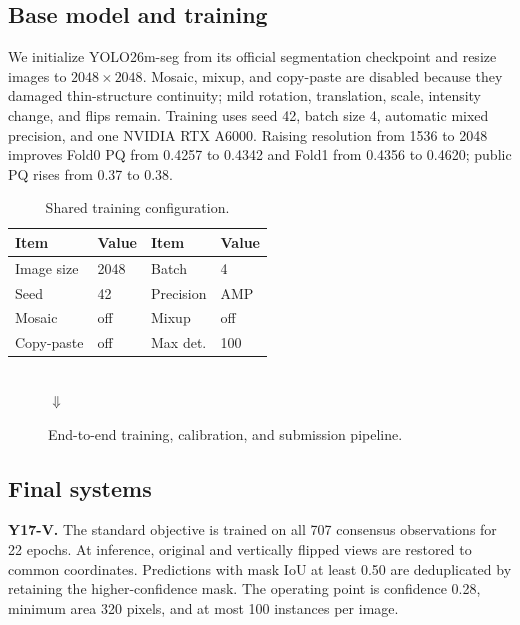 \documentclass[sigconf]{acmart}
\begin{document}
\subsection{Base model and training}
We initialize YOLO26m-seg \cite{ultralytics} from its official segmentation checkpoint and resize
images to $2048\!\times\!2048$. Mosaic, mixup, and copy-paste are disabled because they damaged
thin-structure continuity; mild rotation, translation, scale, intensity change, and flips remain.
Training uses seed 42, batch size 4, automatic mixed precision, and one NVIDIA RTX A6000. Raising
resolution from 1536 to 2048 improves Fold0 PQ from 0.4257 to 0.4342 and Fold1 from 0.4356 to
0.4620; public PQ rises from 0.37 to 0.38.

\begin{table}[!h]
\centering
\caption{Shared training configuration.}
\label{tab:training}
\small
\begin{tabular}{ll@{\qquad}ll}
\toprule
Item & Value & Item & Value \\
\midrule
Image size & 2048 & Batch & 4 \\
Seed & 42 & Precision & AMP \\
Mosaic & off & Mixup & off \\
Copy-paste & off & Max det. & 100 \\
\bottomrule
\end{tabular}
\end{table}

\begin{figure}[t]
  \centering
  \setlength{\fboxsep}{3pt}
  \small
  \\[3pt]
  $\Downarrow$\\[-1pt]
  \caption{End-to-end training, calibration, and submission pipeline.}
  \label{fig:pipeline}
\end{figure}

\subsection{Final systems}
\textbf{Y17-V.} The standard objective is trained on all 707 consensus observations for 22 epochs.
At inference, original and vertically flipped views are restored to common coordinates. Predictions
with mask IoU at least 0.50 are deduplicated by retaining the higher-confidence mask. The operating
point is confidence 0.28, minimum area 320 pixels, and at most 100 instances per image.
\end{document}
